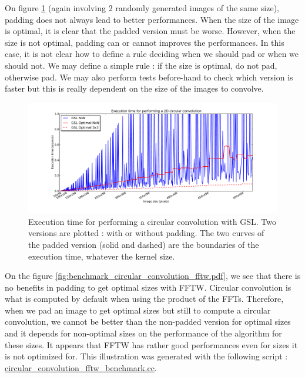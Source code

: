 \documentclass[a4paper,10pt,twoside]{article}
\begin{document}
On figure \ref{fig:benchmark_circular_convolution_gsl.pdf} (again involving 2 randomly generated images of the same size), padding does not always lead to better performances. When the size of the image is optimal, it is clear that the padded version must be worse. However, when the size is not optimal, padding can or cannot improves the performances. In this case, it is not clear how to define a rule deciding when we should pad or when we should not. We may define a simple rule : if the size is optimal, do not pad, otherwise pad. We may also perform tests before-hand to check which version is faster but this is really dependent on the size of the images to convolve.\\

\begin{figure}[htbp]
\center \includegraphics[width=0.75\linewidth]{../Images/benchmark_circular_convolution_gsl.pdf}
\caption{\label{fig:benchmark_circular_convolution_gsl.pdf}Execution time for performing a circular convolution with GSL. Two versions are plotted : with or without padding. The two curves of the padded version (solid and dashed) are the boundaries of the execution time, whatever the kernel size.}
\end{figure}

On the figure \ref{fig:benchmark_circular_convolution_fftw.pdf}, we see that there is no benefits in padding to get optimal sizes with FFTW. Circular convolution is what is computed by default when using the product of the FFTs. Therefore, when we pad an image to get optimal sizes but still to compute a circular convolution, we cannot be better than the non-padded version for optimal sizes and it depends for non-optimal sizes on the performance of the algorithm for these sizes. It appears that FFTW has rather good performances even for sizes it is not optimized for. This illustration was generated with the following script : \href{http://jeremy.fix.free.Fr/Software/Convolution/circular_convolution_fftw_benchmark.cc}{circular\_convolution\_fftw\_benchmark.cc}.\\
\end{document}
